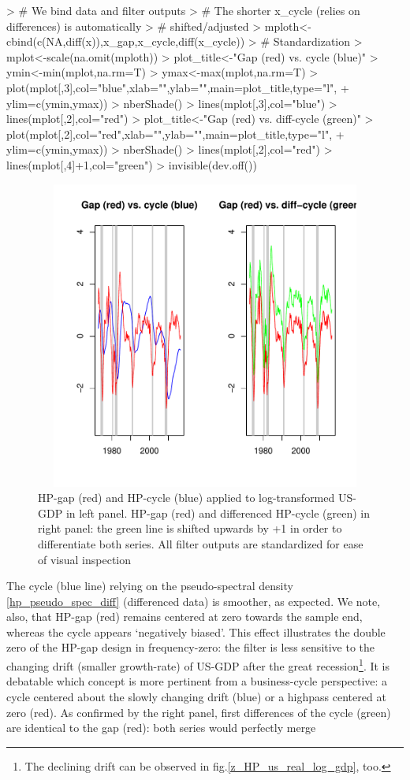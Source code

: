 \documentclass[a4paper]{book}
\begin{document}
\begin{enumerate}
\begin{Schunk}
\begin{Sinput}
> # We bind data and filter outputs
> #   The shorter x_cycle (relies on differences) is automatically 
> #     shifted/adjusted
> mploth<-cbind(c(NA,diff(x)),x_gap,x_cycle,diff(x_cycle))
> # Standardization
> mplot<-scale(na.omit(mploth))
> plot_title<-"Gap (red) vs. cycle (blue)"
> ymin<-min(mplot,na.rm=T)
> ymax<-max(mplot,na.rm=T)
> plot(mplot[,3],col="blue",xlab="",ylab="",main=plot_title,type="l",
+      ylim=c(ymin,ymax))
> nberShade()
> lines(mplot[,3],col="blue")
> lines(mplot[,2],col="red")
> plot_title<-"Gap (red) vs. diff-cycle (green)"
> plot(mplot[,2],col="red",xlab="",ylab="",main=plot_title,type="l",
+      ylim=c(ymin,ymax))
> nberShade()
> lines(mplot[,2],col="red")
> lines(mplot[,4]+1,col="green")
> invisible(dev.off())
\end{Sinput}
\end{Schunk}
\begin{figure}[H]\begin{center}\includegraphics[height=4in, width=6in]{z_HP_us_real_log_gdp_hp_bp}\caption{HP-gap (red) and HP-cycle (blue) applied to log-transformed US-GDP in left panel. HP-gap (red) and differenced HP-cycle (green) in right panel: the green line is shifted upwards by +1 in order to differentiate both series. All filter outputs are standardized for ease of visual inspection\label{z_HP_us_real_log_gdp_hp_bp}}\end{center}\end{figure}The cycle (blue line) relying on the pseudo-spectral density \ref{hp_pseudo_spec_diff} (differenced data) is smoother, as expected. We note, also, that HP-gap (red) remains centered at zero towards the sample end, whereas the cycle appears `negatively biased'. This effect illustrates the double zero of the HP-gap design in frequency-zero: the filter is less sensitive to the changing drift (smaller growth-rate) of US-GDP after the great recession\footnote{The declining drift can be observed in fig.\ref{z_HP_us_real_log_gdp}, too.}. It is debatable which concept is more pertinent from a business-cycle perspective: a cycle centered about the slowly changing drift (blue) or a highpass centered at zero (red). As confirmed by the right panel, first differences of the cycle (green) are identical to the gap (red): both series would perfectly merge 
\end{enumerate}
\end{document}
